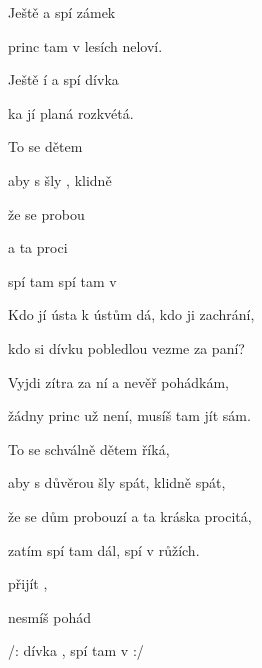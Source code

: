 

\zs
Ještě  a spí zámek 

 princ tam v lesích  neloví.

Ještě í a spí dívka 

ka jí planá  rozkvétá.    

To se  dětem     

aby s  šly , klidně 

že se  probou

a ta  proci  

 spí tam  spí tam v 
\ks

\zs
Kdo jí ústa k ústům dá, kdo ji zachrání,

kdo si dívku pobledlou vezme za paní?

Vyjdi zítra za ní a nevěř pohádkám,

žádny princ už není, musíš tam jít sám.

To se schválně dětem říká,

aby s důvěrou šly spát, klidně spát,

že se dům probouzí a ta kráska procitá,

zatím spí tam dál, spí v růžích.
\ks

\zs
{} přijít ,

nesmíš  pohád  

/:  dívka , spí tam v  :/
\ks

\kp






















